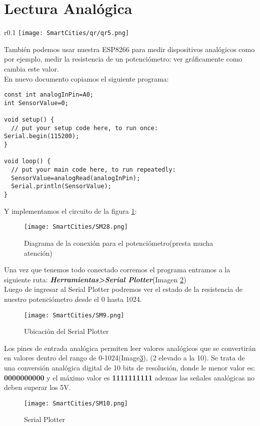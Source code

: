 \documentclass[
	11pt, %
	fleqn, %
	a4paper, %
]{LegrandOrangeBook}
\begin{document}
\section{Lectura Analógica}
\begin{wrapfigure}{r}{0.1\linewidth}
\centering\texttt{[image: SmartCities/qr/qr5.png]}
\caption{QR program: 5.GraphAnalog}
\label{fig:qr5}
\end{wrapfigure}
También podemos usar nuestra ESP8266 para medir dispositivos analógicos como por ejemplo, medir la resistencia de un potenciómetro:  ver gráficamente como cambia este valor.\\
En nuevo documento copiamos el siguiente programa:
\begin{lstlisting}[caption={Medir la resistencia de un potenciómetro},captionpos=b]
const int analogInPin=A0;
int SensorValue=0;

void setup() {
  // put your setup code here, to run once:
Serial.begin(115200);
}

void loop() {
  // put your main code here, to run repeatedly:
  SensorValue=analogRead(analogInPin);
  Serial.println(SensorValue);
}
\end{lstlisting}
Y implementamos el circuito de la figura \ref{fig:readanalog potenciometer}:
\begin{figure}[H]
\centering\texttt{[image: SmartCities/SM28.png]}
\caption{Diagrama de la conexión para el potenciómetro(presta mucha atención)}
\label{fig:readanalog potenciometer}
\end{figure}
Una vez que tenemos todo conectado corremos el programa entramos a la siguiente ruta: \textbf{\textit{Herramientas>Serial Plotter}}(Imagen \ref{fig:UbiSerialPlotter})\\
Luego de ingresar al Serial Plotter podremos ver el estado de la resistencia de nuestro potenciómetro desde el 0 hasta 1024.\\
\begin{figure}[h]
\centering\texttt{[image: SmartCities/SM9.png]}
\caption{Ubicación del Serial Plotter}
\label{fig:UbiSerialPlotter}
\end{figure}
Los pines de entrada analógica permiten leer valores analógicos que se convertirán en valores dentro del rango de 0-1024(Image\ref{fig:SerialPlotter}), (2 elevado a la 10). Se trata de una conversión analógica digital de 10 bits de resolución, donde le menor valor es: \textbf{0000000000} y el máximo valor es \textbf{1111111111} ademas las señales analógicas no deben superar los 5V.
\begin{figure}[H]
\centering\texttt{[image: SmartCities/SM10.png]}
\caption{Serial Plotter}
\label{fig:SerialPlotter}
\end{figure}
\newpage
\end{document}

